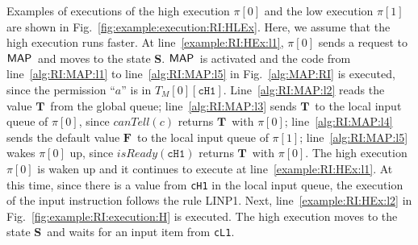 \documentclass[10pt,a4paper,oneside]{article}
\def\sS{\textbf{S}}
\def\TAV{\ensuremath{T_{M}}}
\def\VTRUE{\ensuremath{\textbf{T}}}
\def\VFALSE{\ensuremath{\textbf{F}}}
\def\chnl{\ensuremath{c}}
\def\sanserif#1{\ensuremath{\sf #1}}
\def\MAP{\ensuremath{\sanserif{MAP}}}
\def\Prog{\ensuremath{\pi}}
\def\Progl#1{\ensuremath{\Prog[#1]}}
\def\RINPUTYL{LINP1}
\def\NCMAP{\ensuremath{canTell}}
\def\NISREADY{\ensuremath{isReady}}
\def\canMap#1{\ensuremath{\NCMAP(#1)}}
\def\isReady#1{\ensuremath{\NISREADY(#1)}}
\def\task{\ensuremath{a}}
\def\linecode#1{{\texttt{#1}}}
\begin{document}
Examples of executions of the high execution \Progl{0} and the low execution \Progl{1} are shown in Fig.~\ref{fig:example:execution:RI:HLEx}. Here, we assume that the high execution runs faster. At line~\ref{example:RI:HEx:l1}, \Progl{0} sends a request to \MAP\ and moves to the state \sS. \MAP\ is activated and the code from line~\ref{alg:RI:MAP:l1} to line~\ref{alg:RI:MAP:l5} in Fig.~\ref{alg:MAP:RI} is executed, since the permission ``$\task$'' is in $\TAV[0][\linecode{cH1}]$. Line~\ref{alg:RI:MAP:l2} reads the value \VTRUE\ from the global queue; line~\ref{alg:RI:MAP:l3} sends \VTRUE\ to the local input queue of \Progl{0}, since \canMap{\chnl} returns \VTRUE\ with \Progl{0}; line~\ref{alg:RI:MAP:l4} sends the default value \VFALSE\ to the local input queue of \Progl{1}; line~\ref{alg:RI:MAP:l5} wakes \Progl{0} up, since \isReady{\linecode{cH1}} returns \VTRUE\ with \Progl{0}. The high execution \Progl{0} is waken up and it continues to execute at line~\ref{example:RI:HEx:l1}. At this time, since there is a value from \linecode{cH1} in the local input queue, the execution of the input instruction follows the rule \RINPUTYL. Next, line~\ref{example:RI:HEx:l2} in Fig.~\ref{fig:example:RI:execution:H} is executed. The high execution moves to the state \sS\ and waits for an input item from \linecode{cL1}.
\end{document}
